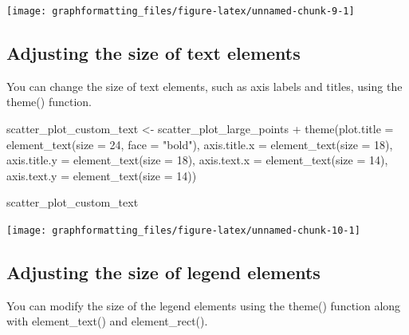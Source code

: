 \documentclass[
]{book}
\newenvironment{Shaded}{\begin{snugshade}}{\end{snugshade}}
\newcommand{\AttributeTok}[1]{\textcolor[rgb]{0.77,0.63,0.00}{#1}}
\newcommand{\DecValTok}[1]{\textcolor[rgb]{0.00,0.00,0.81}{#1}}
\newcommand{\FunctionTok}[1]{\textcolor[rgb]{0.00,0.00,0.00}{#1}}
\newcommand{\NormalTok}[1]{#1}
\newcommand{\OtherTok}[1]{\textcolor[rgb]{0.56,0.35,0.01}{#1}}
\newcommand{\SpecialCharTok}[1]{\textcolor[rgb]{0.00,0.00,0.00}{#1}}
\newcommand{\StringTok}[1]{\textcolor[rgb]{0.31,0.60,0.02}{#1}}
\begin{document}
\texttt{[image: graphformatting\_files/figure-latex/unnamed-chunk-9-1]}

\hypertarget{adjusting-the-size-of-text-elements}{%
\subsection{Adjusting the size of text elements}\label{adjusting-the-size-of-text-elements}}

You can change the size of text elements, such as axis labels and titles, using the theme() function.

\begin{Shaded}
\begin{Highlighting}[]
\NormalTok{scatter\_plot\_custom\_text }\OtherTok{\textless{}{-}}\NormalTok{ scatter\_plot\_large\_points }\SpecialCharTok{+}
  \FunctionTok{theme}\NormalTok{(}\AttributeTok{plot.title =} \FunctionTok{element\_text}\NormalTok{(}\AttributeTok{size =} \DecValTok{24}\NormalTok{, }\AttributeTok{face =} \StringTok{"bold"}\NormalTok{),}
        \AttributeTok{axis.title.x =} \FunctionTok{element\_text}\NormalTok{(}\AttributeTok{size =} \DecValTok{18}\NormalTok{),}
        \AttributeTok{axis.title.y =} \FunctionTok{element\_text}\NormalTok{(}\AttributeTok{size =} \DecValTok{18}\NormalTok{),}
        \AttributeTok{axis.text.x =} \FunctionTok{element\_text}\NormalTok{(}\AttributeTok{size =} \DecValTok{14}\NormalTok{),}
        \AttributeTok{axis.text.y =} \FunctionTok{element\_text}\NormalTok{(}\AttributeTok{size =} \DecValTok{14}\NormalTok{))}

\NormalTok{scatter\_plot\_custom\_text}
\end{Highlighting}
\end{Shaded}

\texttt{[image: graphformatting\_files/figure-latex/unnamed-chunk-10-1]}

\hypertarget{adjusting-the-size-of-legend-elements}{%
\subsection{Adjusting the size of legend elements}\label{adjusting-the-size-of-legend-elements}}

You can modify the size of the legend elements using the theme() function along with element\_text() and element\_rect().
\end{document}

